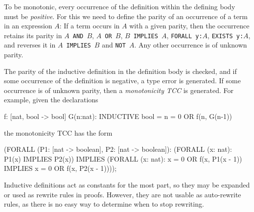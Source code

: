 To be monotonic, every occurrence of the definition within the defining
body must be \emph{positive}. For this we need
to define the parity of an occurrence of a term in an expression $A$: If a
term occurs in $A$ with a given parity, then the occurrence retains its
parity in \texttt{$A$ AND $B$}, \texttt{$A$ OR $B$}, \texttt{$B$ IMPLIES
$A$}, \texttt{FORALL y:$A$}, \texttt{EXISTS y:$A$}, and reverses it in
\texttt{$A$ IMPLIES $B$} and \texttt{NOT $A$}.  Any other occurrence is of
unknown parity.

The parity of the inductive definition in the definition body is checked,
and if some occurrence of the definition is negative, a type error is
generated.  If some occurrence is of unknown parity, then a
\emph{monotonicity TCC} is
generated.  For example, given the declarations
\begin{session}
  f: [nat, bool -> bool]
  G(n:nat): INDUCTIVE bool =
    n = 0 OR f(n, G(n-1))
\end{session}
the monotonicity TCC has the form
\begin{session}
  (FORALL (P1: [nat -> boolean], P2: [nat -> boolean]):
     (FORALL (x: nat): P1(x) IMPLIES P2(x))
         IMPLIES
       (FORALL (x: nat):
          x = 0 OR f(x, P1(x - 1)) IMPLIES x = 0 OR f(x, P2(x - 1))));
\end{session}

Inductive definitions act as constants for the most part, so they may be
expanded or used as rewrite rules in proofs.  However, they are not usable
as auto-rewrite rules, as there is no easy way to determine when to stop
rewriting.

